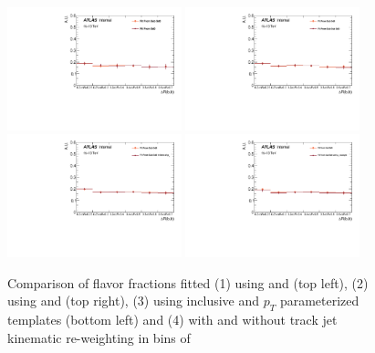 \begin{figure}[htbp]
  \centering
 \includegraphics[width=0.45\textwidth]{figures/gbb/Sub_Sd0_Fits/Canv_dR_leadCrossCheck.pdf}
 \includegraphics[width=0.45\textwidth]{figures/gbb/Sub_Sd0_Fits/Canv_dR_subsubCrossCheck.pdf}\\
 \includegraphics[width=0.45\textwidth]{figures/gbb/Sub_Sd0_Fits/Canv_dR_ptbinCrossCheck.pdf}
 \includegraphics[width=0.45\textwidth]{figures/gbb/Sub_Sd0_Fits/Canv_dR_noreweightCrossCheck.pdf}\\
\caption{Comparison of flavor fractions fitted (1) using \subsdzero and \sdzero (top left), (2) using \subsdzero and \subsubsdzero (top right), (3) using inclusive and $p_T$ parameterized templates (bottom left) and (4) with and without track jet kinematic re-weighting in bins of \drbb}
  \label{fig:dR-fitfrac-crosscheck}
\end{figure}

